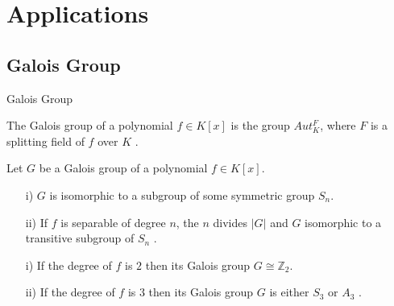 \documentclass{beamer}
\begin{document}
\section{Applications}

\subsection{Galois Group}
\begin{frame}{Galois Group}
  \begin{definition}
    The Galois group of a polynomial \(f \in K[x]\) is the group \(Aut_K^F\), where \(F\) is a splitting field of \(f\) over \(K\) \cite{hunger}.
  \end{definition}


  \begin{tcolorbox}[colframe=blue!40, boxsep=1mm]
    \begin{theorem}
      Let \(G\) be a Galois group of a polynomial \(f \in K[x]\).
      \begin{enumerate}
      \item[i)] \(G\) is isomorphic to a subgroup of some symmetric group \(S_n\)\cite{hunger}.
      \item[ii)] If \(f\) is separable of degree \(n\), the \(n\) divides \(|G|\) and \(G\) isomorphic to a transitive subgroup of \(S_n\) \cite{hunger}.
      \end{enumerate}
    \end{theorem}
  \end{tcolorbox}


  \begin{theorem}[Corollary]
    \begin{enumerate}
    \item[i)] If the degree of \(f\) is \(2\) then its Galois group \(G \cong {\mathbb{Z}}_2\).
    \item[ii)] If the degree of \(f\) is \(3\) then its Galois group \(G\) is either \(S_3\) or \(A_3\) \cite{hunger}.
    \end{enumerate}
  \end{theorem}

\end{frame}
\end{document}
